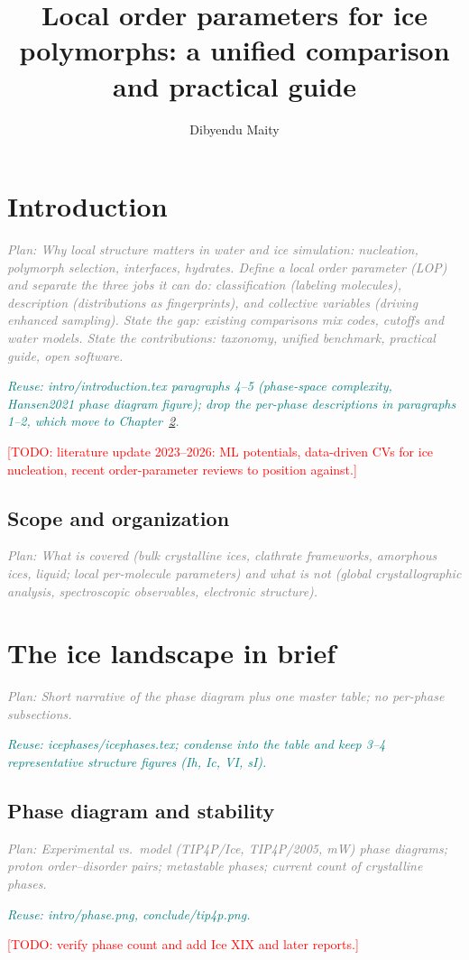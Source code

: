 \documentclass{template1}
\title{Local order parameters for ice polymorphs: a unified comparison and practical guide}
\author{Dibyendu Maity}
\newcommand{\plan}[1]{\par\noindent\textcolor{gray}{\textit{Plan: #1}}\par}
\newcommand{\reuse}[1]{\par\noindent\textcolor{teal}{\textit{Reuse: #1}}\par}
\newcommand{\todo}[1]{\textcolor{red}{[TODO: #1]}}
\begin{document}

\chapter{Introduction}\label{ch:intro}
\plan{Why local structure matters in water and ice simulation: nucleation,
polymorph selection, interfaces, hydrates. Define a local order parameter (LOP)
and separate the three jobs it can do: classification (labeling molecules),
description (distributions as fingerprints), and collective variables
(driving enhanced sampling). State the gap: existing comparisons mix codes,
cutoffs and water models. State the contributions: taxonomy, unified
benchmark, practical guide, open software.}
\reuse{intro/introduction.tex paragraphs 4--5 (phase-space complexity,
Hansen2021 phase diagram figure); drop the per-phase descriptions in
paragraphs 1--2, which move to Chapter~\ref{ch:phases}.}
\todo{literature update 2023--2026: ML potentials, data-driven CVs for ice
nucleation, recent order-parameter reviews to position against.}

\section{Scope and organization}
\plan{What is covered (bulk crystalline ices, clathrate frameworks, amorphous
ices, liquid; local per-molecule parameters) and what is not (global
crystallographic analysis, spectroscopic observables, electronic structure).}

\chapter{The ice landscape in brief}\label{ch:phases}
\plan{Short narrative of the phase diagram plus one master table; no
per-phase subsections.}
\reuse{icephases/icephases.tex; condense into the table and keep 3--4
representative structure figures (Ih, Ic, VI, sI).}

\section{Phase diagram and stability}
\plan{Experimental vs.\ model (TIP4P/Ice, TIP4P/2005, mW) phase diagrams;
proton order--disorder pairs; metastable phases; current count of crystalline
phases.}
\reuse{intro/phase.png, conclude/tip4p.png.}
\todo{verify phase count and add Ice XIX and later reports.}
\end{document}
